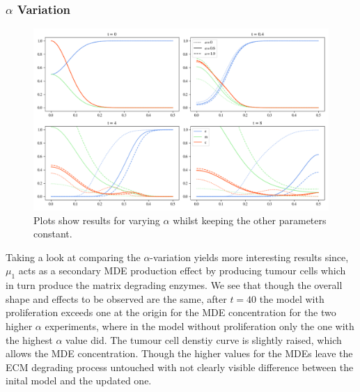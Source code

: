 \subsubsection*{$\alpha$ Variation}
\begin{figure}[h]
    \centering
    \includegraphics[width=\textwidth]{resources/images/prolif_alpha_variation.png}
    \caption{Plots show results for varying $\alpha$ whilst keeping the other parameters constant.}
    \label{fig:prolif_alpha_variation}
\end{figure}

Taking a look at comparing the $\alpha$-variation yields more interesting results since, $\mu_1$ acts as a secondary MDE production effect by producing tumour cells which in turn produce the matrix degrading enzymes. We see that though the overall shape and effects to be observed are the same, after $t=40$ the model with proliferation exceeds one at the origin for the MDE concentration for the two higher $\alpha$ experiments, where in the model without proliferation only the one with the highest $\alpha$ value did. The tumour cell denstiy curve is slightly raised, which allows the MDE concentration. Though the higher values for the MDEs leave the ECM degrading process untouched with not clearly visible difference between the inital model and the updated one. 

